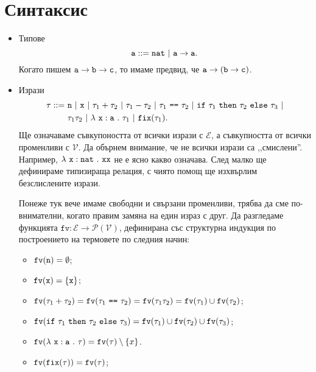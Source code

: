 \section{Синтаксис}

\newcommand{\rename}[2]{\{\vv{#1}/{#2}\}}

\newcommand{\var}{\texttt{var}}
\newcommand{\fv}{\texttt{fv}}

\begin{itemize}
\item{}
  Типове
  \[\vv{a} ::= \vv{nat}\ |\ \vv{a} \to \vv{a}.\]
  Когато пишем 
  $\texttt{a} \to \texttt{b} \to \texttt{c}$, то имаме предвид, че
  $\texttt{a} \to (\texttt{b} \to \texttt{c})$.
\item{}
  Изрази
  \begin{align*}
    \tau ::=\ & \vv{n}\ |\ \vv{x}\ |\ \tau_1 + \tau_2\ |\ \tau_1 - \tau_2\ |\  \tau_1\ \vv{==}\ \tau_2\ |\ \ifelse{\tau_1}{\tau_2}{\tau_3}\ |\\
              & \tau_1\tau_2\ |\ \lamb{x}{a}{\tau_1}\ |\ \fix(\tau_1).
  \end{align*}
  Ще означаваме съвкупоността от всички изрази с $\mathcal{E}$, а съвкупността от всички променливи с $\mathcal{V}$.
  Да обърнем внимание, че не всички изрази са ,,смислени''. Например,
  $\lambda~\texttt{x}:\texttt{nat}~.~{\texttt{xx}}$ не е ясно какво означава.
  След малко ще дефинираме типизираща релация, с чиято помощ ще изхвърлим безслислените изрази.
  
  Понеже тук вече имаме свободни и свързани променливи, трябва да сме по-внимателни, когато правим замяна на един израз с друг. Да разгледаме функцията $\fv:\mathcal{E} \to \mathcal{P}(\mathcal{V})$, дефинирана със структурна индукция по построението на термовете по следния начин:
  
  \begin{itemize}
  \item
    $\fv(\vv{n}) = \emptyset$;
  \item
    $\fv(\vv{x}) = \{\vv{x}\}$;
  \item
    $\fv(\tau_1 + \tau_2) = \fv(\tau_1\ \vv{==}\ \tau_2) = \fv(\tau_1\tau_2) = \fv(\tau_1) \cup \fv(\tau_2)$;
  \item
    $\fv(\ifelse{\tau_1}{\tau_2}{\tau_3}) = \fv(\tau_1) \cup \fv(\tau_2) \cup \fv(\tau_3)$;
  \item
    $\fv(\lamb{x}{a}{\tau}) = \fv(\tau) \setminus \{x\}$.
  \item
    $\fv(\fix(\tau)) = \fv(\tau)$;
  \end{itemize}
  

\end{itemize}
